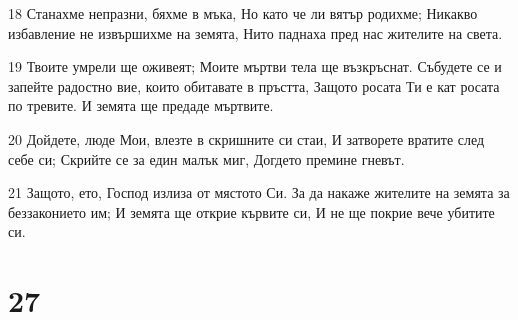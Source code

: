 \par 18 Станахме непразни, бяхме в мъка, Но като че ли вятър родихме; Никакво избавление не извършихме на земята, Нито паднаха пред нас жителите на света.
\par 19 Твоите умрели ще оживеят; Моите мъртви тела ще възкръснат. Събудете се и запейте радостно вие, които обитавате в пръстта, Защото росата Ти е кат росата по тревите. И земята ще предаде мъртвите.
\par 20 Дойдете, люде Мои, влезте в скришните си стаи, И затворете вратите след себе си; Скрийте се за един малък миг, Догдето премине гневът.
\par 21 Защото, ето, Господ излиза от мястото Си. За да накаже жителите на земята за беззаконието им; И земята ще открие кървите си, И не ще покрие вече убитите си.

\chapter{27}

